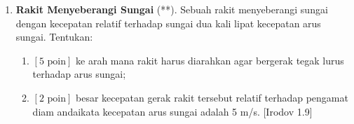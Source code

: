 \documentclass[12pt, a4paper]{article}\usepackage[utf8]{inputenc}
\theoremstyle{definition}
\theoremstyle{definition}
\begin{document}
\begin{enumerate}
\begin{center}
			\end{center}
			
			
			\item \textbf{Rakit Menyeberangi Sungai} (**). Sebuah rakit menyeberangi sungai dengan kecepatan relatif terhadap sungai dua kali lipat kecepatan arus sungai. Tentukan:
			\begin{enumerate}[label=(\alph*)]
				\item $\left[ \text{5 poin} \right]$ ke arah mana rakit harus diarahkan agar bergerak tegak lurus terhadap arus sungai;
				\item $\left[ \text{2 poin} \right]$ besar kecepatan gerak rakit tersebut relatif terhadap pengamat diam andaikata kecepatan arus sungai adalah 5 m/s. [Irodov 1.9]
			\end{enumerate}
			
			\begin{center}
				
				
				
				\begin{tikzpicture}[x=0.75pt,y=0.75pt,yscale=-1,xscale=1]
					

\end{tikzpicture}
\end{center}
\end{enumerate}
\end{document}
